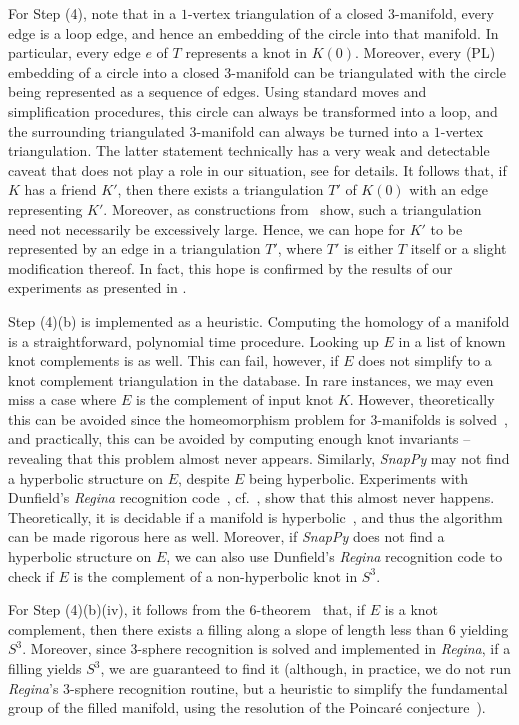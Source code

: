 \documentclass{amsart} %
\theoremstyle{thm}
\theoremstyle{definition}
\numberwithin{equation}{section}
\begin{document}
For Step (4), note that in a $1$-vertex triangulation of a closed $3$-manifold, every edge is a loop edge, and hence an embedding of the circle into that manifold. In particular, every edge $e$ of $T$ represents a knot in $K(0)$. Moreover, every (PL) embedding of a circle into a closed $3$-manifold can be triangulated with the circle being represented as a sequence of edges. Using standard moves and simplification procedures, this circle can always be transformed into a loop, and the surrounding triangulated $3$-manifold can always be turned into a $1$-vertex triangulation. The latter statement technically has a very weak and detectable caveat that does not play a role in our situation, see \cite{burton12-unknot} for details. It follows that, if $K$ has a friend $K'$, then there exists a triangulation $T'$ of $K(0)$ with an edge representing $K'$. Moreover, as constructions from~\cite{knotted_edge,knot_factorisation} show, such a triangulation need not necessarily be excessively large. Hence, we can hope for $K'$ to be represented by an edge in a triangulation $T'$, where $T'$ is either $T$ itself or a slight modification thereof. In fact, this hope is confirmed by the results of our experiments as presented in . 

Step (4)(b) is implemented as a heuristic. Computing the homology of a manifold is a straightforward, polynomial time procedure. Looking up $E$ in a list of known knot complements is as well. This can fail, however, if $E$ does not simplify to a knot complement triangulation in the database. In rare instances, we may even miss a case where $E$ is the complement of input knot $K$. However, theoretically this can be avoided since the homeomorphism problem for $3$-manifolds is solved~\cite{Kuperberg}, and practically, this can be avoided by computing enough knot invariants -- revealing that this problem almost never appears. Similarly, {\em SnapPy} may not find a hyperbolic structure on $E$, despite $E$ being hyperbolic. Experiments with Dunfield's {\em Regina} recognition code~\cite{Dunfield_census}, cf.~\cite{FPS_code}, show that this almost never happens. Theoretically, it is decidable if a manifold is hyperbolic~\cite{decide_hyperbolic}, and thus the algorithm can be made rigorous here as well. Moreover, if {\em SnapPy} does not find a hyperbolic structure on $E$, we can also use Dunfield's {\em Regina} recognition code to check if $E$ is the complement of a non-hyperbolic knot in $S^3$. 

For Step (4)(b)(iv), it follows from the 6-theorem~\cite{Ag00,La00} that, if $E$ is a knot complement, then there exists a filling along a slope of length less than $6$ yielding $S^3$. Moreover, since $3$-sphere recognition is solved and implemented in {\em Regina}, if a filling yields $S^3$, we are guaranteed to find it (although, in practice, we do not run {\em Regina}'s $3$-sphere recognition routine, but a heuristic to simplify the fundamental group of the filled manifold, using the resolution of the Poincar\'e conjecture~\cite{perelman1,perelman2}). 
\end{document}
